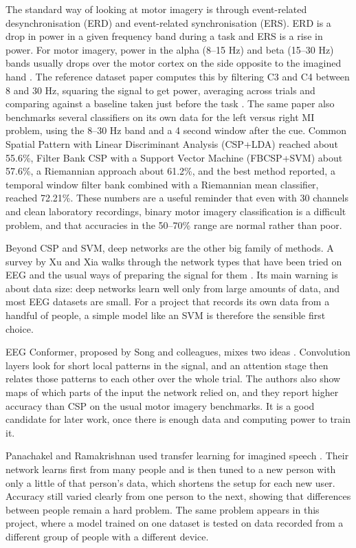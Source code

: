 The standard way of looking at motor imagery is through event-related desynchronisation
(ERD) and event-related synchronisation (ERS). ERD is a drop in power in a given frequency
band during a task and ERS is a rise in power. For motor imagery, power in the alpha
(8--15 Hz) and beta (15--30 Hz) bands usually drops over the motor cortex on the side
opposite to the imagined hand \cite{pfurtscheller1999erd}. The reference dataset paper computes this by filtering C3
and C4 between 8 and 30 Hz, squaring the signal to get power, averaging across trials and
comparing against a baseline taken just before the task \cite{liu2024mi}. The same paper
also benchmarks several classifiers on its own data for the left versus right MI problem,
using the 8--30 Hz band and a 4 second window after the cue. Common Spatial Pattern with
Linear Discriminant Analysis (CSP+LDA) \cite{ramoser2000csp} reached about 55.6\%, Filter
Bank CSP with a Support Vector Machine (FBCSP+SVM) \cite{ang2012fbcsp, cortes1995svm}
about 57.6\%, a Riemannian approach \cite{barachant2012riemann} about 61.2\%, and the best
method reported, a temporal window filter bank combined with a Riemannian mean classifier,
reached 72.21\%. These numbers are a useful reminder that even with 30 channels and clean
laboratory recordings, binary motor imagery classification is a difficult problem, and that
accuracies in the 50--70\% range are normal rather than poor.

Beyond CSP and SVM, deep networks are the other big family of methods. A survey by Xu
and Xia walks through the network types that have been tried on EEG and the usual ways of
preparing the signal for them \cite{xu2023review}. Its main warning is about data size:
deep networks learn well only from large amounts of data, and most EEG datasets are small.
For a project that records its own data from a handful of people, a simple model like an
SVM is therefore the sensible first choice.

EEG Conformer, proposed by Song and colleagues, mixes two ideas
\cite{song2023conformer}. Convolution layers look for short local patterns in the signal,
and an attention stage then relates those patterns to each other over the whole trial. The
authors also show maps of which parts of the input the network relied on, and they report
higher accuracy than CSP on the usual motor imagery benchmarks. It is a good candidate for
later work, once there is enough data and computing power to train it.

Panachakel and Ramakrishnan used transfer learning for imagined speech
\cite{jerrin2021imagined}. Their network learns first from many people and is then tuned to
a new person with only a little of that person's data, which shortens the setup for each
new user. Accuracy still varied clearly from one person to the next, showing that
differences between people remain a hard problem. The
same problem appears in this project, where a model trained on one dataset is tested on
data recorded from a different group of people with a different device.

